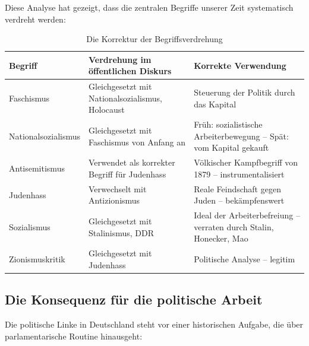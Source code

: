 Diese Analyse hat gezeigt, dass die zentralen Begriffe unserer Zeit systematisch verdreht werden:

\begin{table}[ht]
\centering
\begin{tabular}{|p{}|p{}|p{}|}
\hline
\textbf{Begriff} & \textbf{Verdrehung im öffentlichen Diskurs} & \textbf{Korrekte Verwendung} \\
\hline
Faschismus & Gleichgesetzt mit Nationalsozialismus, Holocaust & Steuerung der Politik durch das Kapital \\
\hline
Nationalsozialismus & Gleichgesetzt mit Faschismus von Anfang an & Früh: sozialistische Arbeiterbewegung – Spät: vom Kapital gekauft \\
\hline
Antisemitismus & Verwendet als korrekter Begriff für Judenhass & Völkischer Kampfbegriff von 1879 – instrumentalisiert \\
\hline
Judenhass & Verwechselt mit Antizionismus & Reale Feindschaft gegen Juden – bekämpfenswert \\
\hline
Sozialismus & Gleichgesetzt mit Stalinismus, DDR & Ideal der Arbeiterbefreiung – verraten durch Stalin, Honecker, Mao \\
\hline
Zionismuskritik & Gleichgesetzt mit Judenhass & Politische Analyse – legitim \\
\hline
\end{tabular}
\caption{Die Korrektur der Begriffsverdrehung}
\end{table}

\subsection{Die Konsequenz für die politische Arbeit}

Die politische Linke in Deutschland steht vor einer historischen Aufgabe, die über parlamentarische Routine hinausgeht:


